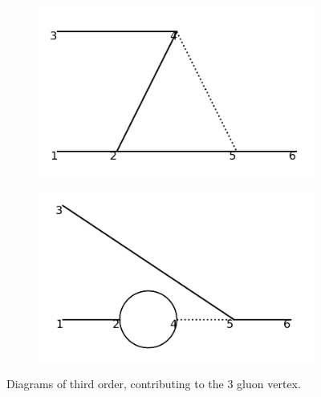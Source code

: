 \documentclass[11pt,a4paper,twoside,pdf]{article}
\numberwithin{equation}{section}
\begin{document}
\begin{figure}[h!]
\begin{subfigure}[t]{0.24\textwidth}
        \caption{ }
        \label{fig:order3_1to2/6}
    \end{subfigure}
    \hfill
    \begin{subfigure}[t]{0.24\textwidth}
        \centering
        \includegraphics[width=\textwidth]{plots/order3/order3_1to2/7.png}
        \caption{ }
    \end{subfigure}
    \hfill 
    \begin{subfigure}[t]{0.24\textwidth}
        \centering
        \includegraphics[width=\textwidth]{plots/order3/order3_1to2/8.png}
        \caption{ }
    \end{subfigure}
    \caption{Diagrams of third order, contributing to the 3 gluon vertex.}
    \label{fig:order3_1to2}
\end{figure}
\end{document}
